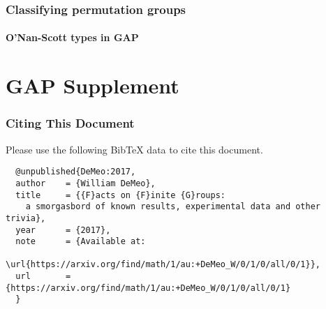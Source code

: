 \newpage

\section{Classifying permutation groups}
\label{sec:class-perm-groups}





\subsection{O'Nan-Scott types in GAP}
\label{sec:prim-perm-groups}


\newpage


\newpage
\part*{GAP Supplement}

\newpage


\newpage


\section{Citing This Document}
Please use the following BibTeX data to cite this document.



{\small
\begin{verbatim}
  @unpublished{DeMeo:2017,
  author    = {William DeMeo},
  title     = {{F}acts on {F}inite {G}roups:
    a smorgasbord of known results, experimental data and other trivia},
  year      = {2017},
  note      = {Available at: 
         \url{https://arxiv.org/find/math/1/au:+DeMeo_W/0/1/0/all/0/1}},
  url       = {https://arxiv.org/find/math/1/au:+DeMeo_W/0/1/0/all/0/1}
  }
\end{verbatim}
}
%
%
%
%






